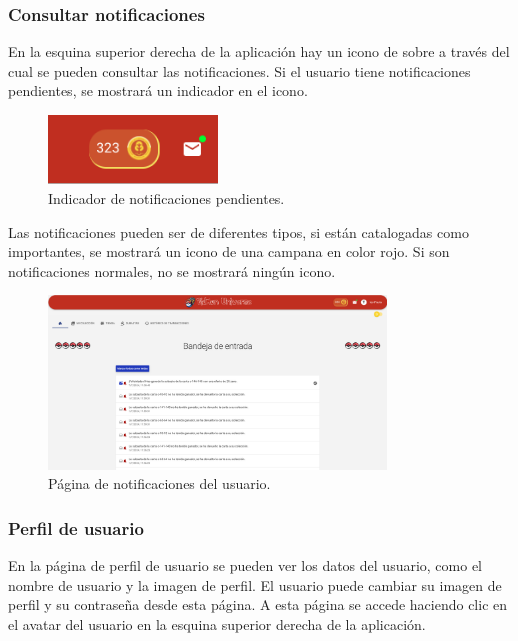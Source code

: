 \begin{enumerate}
\subsubsection{Consultar notificaciones}
En la esquina superior derecha de la aplicación hay un icono de sobre a través del cual se pueden consultar las notificaciones.
Si el usuario tiene notificaciones pendientes, se mostrará un indicador en el icono.
\begin{figure}[H]
    \centering
    \includegraphics[width=0.4\textwidth]{figures/6-Analisis/6-Interfaz/interfaz/notificaciones_1.png}
    \caption{Indicador de notificaciones pendientes.}
    \label{fig:m-interfaz-notificaciones1}
\end{figure}
Las notificaciones pueden ser de diferentes tipos, si están catalogadas como importantes, se mostrará un icono de una campana en color rojo.
Si son notificaciones normales, no se mostrará ningún icono.

\begin{figure}[H]
    \centering
    \includegraphics[width=0.8\textwidth]{figures/6-Analisis/6-Interfaz/interfaz/notificaciones_2.png}
    \caption{Página de notificaciones del usuario.}
    \label{fig:m-interfaz-notificaciones2}
\end{figure}


\subsubsection{Perfil de usuario}
En la página de perfil de usuario se pueden ver los datos del usuario, como el nombre de usuario y la imagen de perfil.
El usuario puede cambiar su imagen de perfil y su contraseña desde esta página.
A esta página se accede haciendo clic en el avatar del usuario en la esquina superior derecha de la aplicación.


\end{enumerate}

